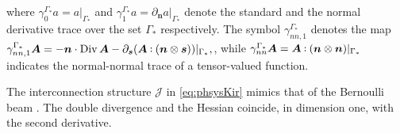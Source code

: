 where $\gamma_{0}^{\Gamma_*}a = a\vert_{\Gamma_*}$ and  $\gamma_{1}^{\Gamma_*}a = \partial_{\bm{n}} a \vert_{\Gamma_*}$ denote the standard and the normal derivative trace over the set $\Gamma_*$ respectively. The symbol $\gamma_{nn, 1}^{\Gamma_*}$ denotes the map $\gamma_{nn, 1}^{\Gamma_*}\bm{A} = -\bm{n} \cdot \Div \bm{A} - \partial_{\bm{s}} (\bm{A} \cddot (\bm{n} \otimes \bm{s}))\vert_{\Gamma_*},$, while $\gamma_{nn}^{\Gamma_*}\bm{A} = \bm{A} \cddot (\bm{n} \otimes \bm{n})\vert_{\Gamma_*}$ indicates the normal-normal trace of a tensor-valued function.

\begin{remark}
	The interconnection structure $\mathcal{J}$ in \eqref{eq:phsysKir} mimics that of the Bernoulli beam \cite{cardoso2017}. The double divergence and the Hessian coincide, in dimension one, with the second derivative.
\end{remark}


